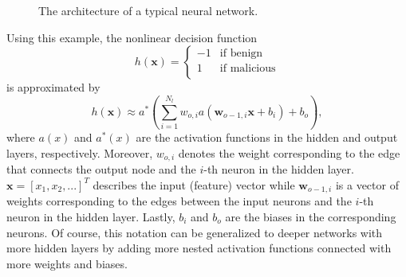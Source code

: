 \documentclass[paper=a4, fontsize=11pt]{scrartcl} %
\begin{document}
\begin{figure}[H]
	\centering
	\caption{The architecture of a typical neural network.}
	\label{fig:nn_drawing}
\end{figure}

Using this example, the nonlinear decision function 
\[ h(\textbf{x}) =  \left\{
\begin{array}{ll}
-1 & \text{if benign} \\
1 &  \text{if malicious} \\
\end{array} 
\right. \]
is approximated by 
\begin{equation}
\label{eq:nn_approx}
h(\textbf{x})\approx a^*\left(\sum\limits_{i=1}^{N_l}w_{o,i}a(\textbf{w}_{o-1,i}\textbf{x}+b_i)+b_o\right),
\end{equation}
where $a(x)$ and $a^*(x)$ are the activation functions in the hidden and output layers, respectively. 
Moreover, $w_{o,i}$ denotes the weight corresponding to the edge that connects the output node and the $i$-th neuron in the hidden layer.
$\textbf{x}=[x_1, x_2, ...]^T$ describes the input (feature) vector while $\textbf{w}_{o-1,i}$ is a vector of weights corresponding to the edges between the input neurons and the $i$-th neuron in the hidden layer.
Lastly, $b_i$ and $b_o$ are the biases in the corresponding neurons.
Of course, this notation can be generalized to deeper networks with more hidden layers by adding more nested activation functions connected with more weights and biases.
\end{document}
